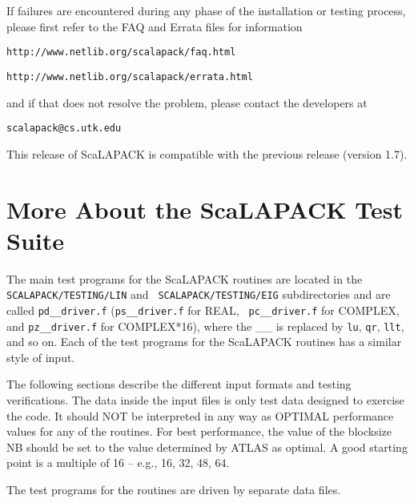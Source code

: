 \documentclass[11pt]{report}
\newcommand{\dent}{\hspace*{\parindent}}
\begin{document}
If failures are encountered during any phase of the installation or
testing process,
please first refer to the FAQ and Errata files for information
\begin{list}{}{}
\item {\tt http://www.netlib.org/scalapack/faq.html}
\item {\tt http://www.netlib.org/scalapack/errata.html}
\end{list}
and if that does not resolve the problem, please contact
the developers at
\begin{list}{}{}
\item {\tt scalapack@cs.utk.edu}
\end{list}

This release of ScaLAPACK is compatible with the previous release
(version 1.7).

\section{More About the ScaLAPACK Test Suite}
\label{LTDET}
\dent
The main test programs for the ScaLAPACK
routines are located in the {\tt SCALAPACK/TESTING/LIN} and {\tt
SCALAPACK/TESTING/EIG} subdirectories and
are called {\tt pd\_\_driver.f} ({\tt ps\_\_driver.f} for REAL, {\tt
pc\_\_driver.f} for COMPLEX, and {\tt pz\_\_driver.f} for COMPLEX*16),
where the \_\_ is replaced by {\tt lu},
{\tt qr}, {\tt llt}, and so on.  Each of the test programs for the
ScaLAPACK routines has a similar style of input.


The following sections describe the different input formats and
testing verifications.  The data inside the input files is only test
data designed to exercise the code.  It should NOT be interpreted
in any way as OPTIMAL performance values for any of the routines.  
For best performance, the value of the blocksize NB should
be set to the value determined by ATLAS as optimal.  A good
starting point is a multiple of 16 -- e.g., 16, 32, 48, 64.

The test programs for the routines are driven by separate data files.
\end{document}
